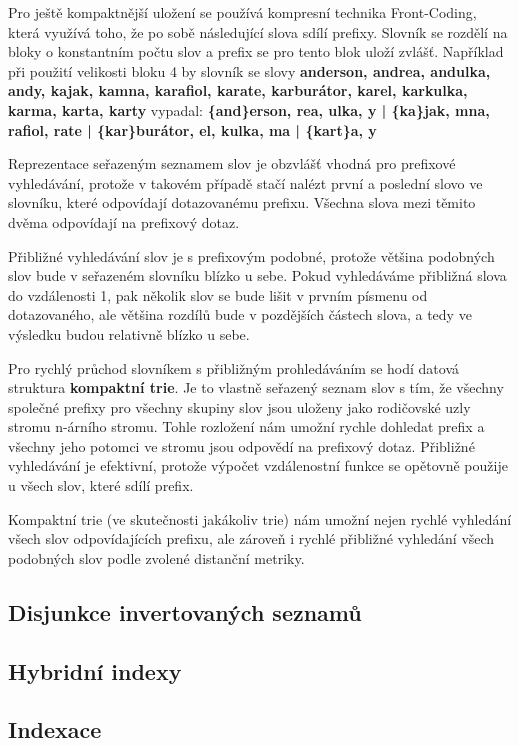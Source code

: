 \documentclass[11pt]{article}
\begin{document}
Pro ještě kompaktnější uložení se používá kompresní technika Front-Coding,
která využívá toho, že po sobě následující slova sdílí prefixy. Slovník se
rozdělí na bloky o konstantním počtu slov a prefix se pro tento blok uloží
zvlášť. Například při použití velikosti bloku 4 by slovník se slovy
\textbf{anderson, andrea, andulka, andy, kajak, kamna, karafiol, karate,
karburátor, karel, karkulka, karma, karta, karty} vypadal:
\textbf{\{and\}erson, rea, ulka, y | \{ka\}jak, mna, rafiol, rate | \{kar\}burátor, el, kulka, ma | \{kart\}a, y}

Reprezentace seřazeným seznamem slov je obzvlášť vhodná pro prefixové
vyhledávání, protože v takovém případě stačí nalézt první a poslední slovo ve
slovníku, které odpovídají dotazovanému prefixu. Všechna slova mezi těmito
dvěma odpovídají na prefixový dotaz.

Přibližné vyhledávání slov je s prefixovým podobné, protože většina podobných
slov bude v seřazeném slovníku blízko u sebe. Pokud vyhledáváme přibližná slova
do vzdálenosti 1, pak několik slov se bude lišit v prvním písmenu od
dotazovaného, ale většina rozdílů bude v pozdějších částech slova, a tedy ve
výsledku budou relativně blízko u sebe.

Pro rychlý průchod slovníkem s přibližným prohledáváním se hodí datová
struktura \textbf{kompaktní trie}. Je to vlastně seřazený seznam slov s tím, že
všechny společné prefixy pro všechny skupiny slov jsou uloženy jako rodičovské
uzly stromu n-árního stromu. Tohle rozložení nám umožní rychle dohledat prefix
a všechny jeho potomci ve stromu jsou odpovědí na prefixový dotaz. Přibližné
vyhledávání je efektivní, protože výpočet vzdálenostní funkce se opětovně
použije u všech slov, které sdílí prefix.

Kompaktní trie (ve skutečnosti jakákoliv trie) nám umožní nejen rychlé
vyhledání všech slov odpovídajících prefixu, ale zároveň i rychlé přibližné
vyhledání všech podobných slov podle zvolené distanční metriky.

\subsection{Disjunkce invertovaných seznamů}
\subsection{Hybridní indexy}
\subsection{Indexace}
\end{document}
